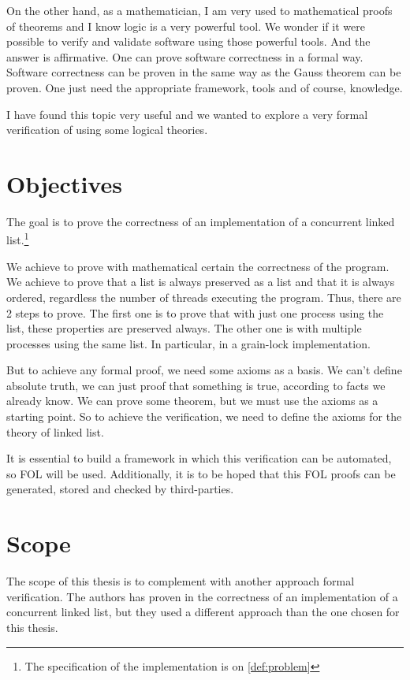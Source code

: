 On the other hand, as a mathematician, I am very used to mathematical proofs of theorems and I know logic is a very powerful tool.
%
We wonder if it were possible to verify and validate software using those powerful tools.
%
And the answer is affirmative.
%
One can prove software correctness in a formal way.
% 
Software correctness can be proven in the same way as the Gauss theorem can be proven.
%
One just need the appropriate framework, tools and of course, knowledge.


I have found this topic very useful and we wanted to explore a very formal verification of using some logical theories.


\section{Objectives}

The goal is to prove the correctness of an implementation of a concurrent linked list.\footnote{The specification of the implementation is on \ref{def:problem}}

We achieve to prove with mathematical certain the correctness of the program. 
%
We achieve to prove that a list is always preserved as a list and that it is always ordered, regardless the number of threads executing the program.
%
Thus, there are 2 steps to prove. 
%
The first one is to prove that with just one process using the list, these properties are preserved always. 
%
The other one is with multiple processes using the same list. 
%
In particular, in a grain-lock implementation.

But to achieve any formal proof, we need some axioms as a basis.
%
We can't define absolute truth, we can just proof that something is true, according to facts we already know. 
%
We can prove some theorem, but we must use the axioms as a starting point. 
%
So to achieve the verification, we need to define the axioms for the theory of linked list.

It is essential to build a framework in which this verification can be automated, so \gls{FOL} will be used. 
%
Additionally, it is to be hoped that this \gls{FOL} proofs can be generated, stored and checked by third-parties.


\section{Scope}

The scope of this thesis is to complement \cite{thesisAle} with another approach formal verification. 
%
The authors has proven in \cite{thesisAle} the correctness of an implementation of a concurrent linked list, but they used a different approach than the one chosen for this thesis.


